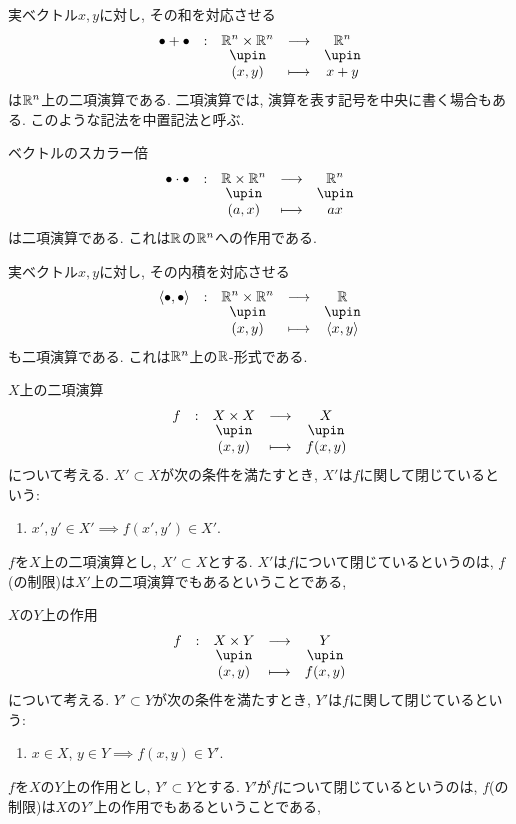 \begin{example}
  実ベクトル$x,y$に対し, その和を対応させる
  \begin{align*}
    \shazo{\tofu+\tofu}
          {\RR^n\times \RR^n}{\RR^n}
          {(x,y)}{x+y}
  \end{align*}
  は$\mathbb{R}^n$上の二項演算である.
  二項演算では, 演算を表す記号を中央に書く場合もある.
  このような記法を中置記法と呼ぶ.
\end{example}

\begin{example}
 ベクトルのスカラー倍
  \begin{align*}
    \shazo{\tofu \cdot \tofu}
          {\RR\times \RR^n}{\RR^n}
          {(a,x)}{ax}
  \end{align*}
  は二項演算である.
  これは$\mathbb{R}$の$\mathbb{R}^n$への作用である.
\end{example}

\begin{example}
  実ベクトル$x,y$に対し, その内積を対応させる
  \begin{align*}
    \shazo{\Braket{\tofu,\tofu}}
          {\RR^n\times \RR^n}{\RR}
          {(x,y)}{\Braket{x,y}}
  \end{align*}
  も二項演算である.
  これは$\mathbb{R}^n$上の$\mathbb{R}$-形式である.
\end{example}

\begin{definition}
  $X$上の二項演算
  \begin{align*}
    \shazo{f}
          {X\times X}{X}
          {(x,y)}{f(x,y)}
  \end{align*}
  について考える.
  $X'\subset X$が次の条件を満たすとき,
  $X'$は$f$に関して閉じているという:
  \begin{enumerate}
  \item $x',y'\in X'\implies f(x',y')\in X'$.
  \end{enumerate}
\end{definition}
\begin{remark}
  $f$を$X$上の二項演算とし,
  $X'\subset X$とする.
  $X'$は$f$について閉じているというのは,
  $f$(の制限)は$X'$上の二項演算でもあるということである,
\end{remark}



\begin{definition}
  $X$の$Y$上の作用
  \begin{align*}
    \shazo{f}
          {X\times Y}{Y}
          {(x,y)}{f(x,y)}
  \end{align*}
  について考える.
  $Y'\subset Y$が次の条件を満たすとき,
  $Y'$は$f$に関して閉じているという:
  \begin{enumerate}
  \item $x\in X$, $y\in Y\implies f(x,y)\in Y'$.
  \end{enumerate}
\end{definition}
\begin{remark}
  $f$を$X$の$Y$上の作用とし,
  $Y'\subset Y$とする.
  $Y'$が$f$について閉じているというのは,
  $f$(の制限)は$X$の$Y'$上の作用でもあるということである,
\end{remark}


